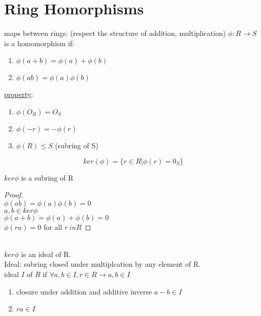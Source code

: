 \documentclass{article}
\begin{document}
\section{Ring Homorphisms}
maps between rings: (respect the structure of addition, multiplication)
$\phi: R \to S$ is a homomorphism if: 

\begin{enumerate}
    \item $\phi(a+b) = \phi(a) + \phi(b) $
    \item $\phi(ab) = \phi(a)\phi(b)$
\end{enumerate}
\underline{property}:\begin{enumerate}
    \item $\phi(O_R) = O_S$ 
    \item $\phi(-r) = -\phi(r)$ 
    \item $\phi(R) \leq S$ (subring of S)
\end{enumerate}
\begin{definition}[ker]
    
    $$ker(\phi) = \{r \in R| \phi(r) = 0_S\}$$

\end{definition}
\begin{proposition}
    $ker\phi$ is a subring of R
\end{proposition}
\begin{proof}
    \leavevmode \\ 
    $\phi(ab) = \phi(a) \phi(b) = 0 $ \\ 
    $a, b \in ker\phi$   \\ 
    $\phi(a + b) = \phi(a) + \phi(b ) = 0$ \\ 
    $\phi(ra) = 0 $ for all $r \ in R$ 
\end{proof}
\begin{definition}[ideal] \leavevmode \\ 
    $ker\phi$ is an ideal of R. \\ 
    Ideal: subring closed under multiplcation by any element of R. \\ 
    ideal $I$ of $R$ if $\forall a, b \in I, r \in R \rightarrow a,b\in I$
    
\end{definition}

\begin{enumerate}
    \item closure under addition and additive inverse $a-b \in I$ 
    \item $ra \in I $
\end{enumerate}
\end{document}

